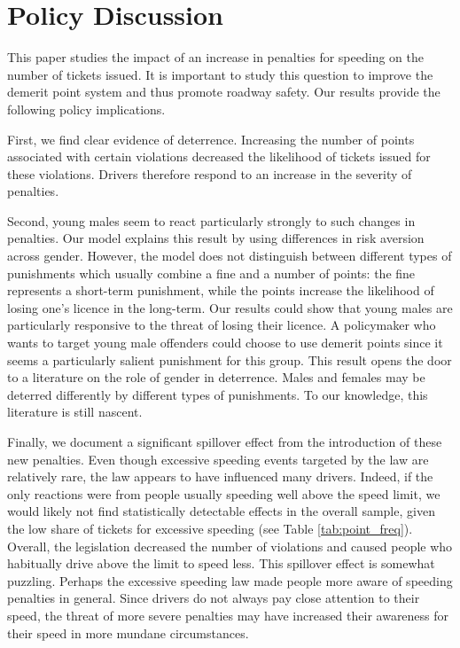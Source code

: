 \section{Policy Discussion}
\label{sec:Discussion}

This paper studies the impact of an increase in penalties for speeding 
on the number of tickets issued. 
It is important to study this question to improve the demerit point system 
and thus promote roadway safety. 
Our results provide the following policy implications.

First, we find clear evidence of deterrence. 
Increasing the number of points associated with certain violations 
decreased the likelihood of tickets issued for these violations. 
Drivers therefore respond to an increase in the severity of penalties.

Second, young males seem to react particularly strongly to such changes in penalties. 
Our model explains this result by using differences in risk aversion across gender. 
However, the model does not distinguish between different types of punishments 
which usually combine a fine and a number of points: 
the fine represents a short-term punishment, 
while the points increase the likelihood of losing one’s licence in the long-term. 
Our results could show that young males are particularly responsive 
to the threat of losing their licence. 
A policymaker who wants to target young male offenders could choose to use demerit points 
since it seems a particularly salient punishment for this group. 
This result opens the door to a literature on the role of gender in deterrence. 
Males and females may be deterred differently by different types of punishments. 
To our knowledge, this literature is still nascent.

Finally, we document a significant spillover effect 
from the introduction of these new penalties. 
Even though excessive speeding events targeted by the law are relatively rare, 
the law appears to have influenced many drivers. 
Indeed, if the only reactions were from people usually speeding well above the speed limit, 
we would likely not find statistically detectable effects in the overall sample, 
given the low share of tickets for excessive speeding 
(see Table \ref{tab:point_freq}). 
Overall, the legislation decreased the number of violations 
and caused people who habitually drive above the limit to speed less. 
This spillover effect is somewhat puzzling. 
Perhaps the excessive speeding law made people more aware of speeding penalties in general. 
Since drivers do not always pay close attention to their speed, 
the threat of more severe penalties may have increased their 
awareness for their speed in more mundane circumstances.



